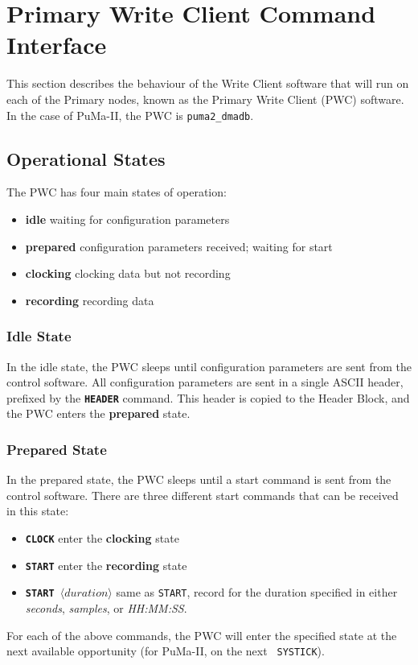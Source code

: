 \section{Primary Write Client Command Interface}
\label{sec:pwc}

This section describes the behaviour of the Write Client software that
will run on each of the Primary nodes, known as the Primary Write
Client (PWC) software.  In the case of PuMa-II, the PWC is 
{\tt puma2\_dmadb}.

\subsection{Operational States}

The PWC has four main states of operation:
\begin{itemize}
\item {\bf idle} waiting for configuration parameters
\item {\bf prepared} configuration parameters received; waiting for start
\item {\bf clocking} clocking data but not recording
\item {\bf recording} recording data
\end{itemize}

\subsubsection{Idle State}

In the idle state, the PWC sleeps until configuration parameters are
sent from the control software.  All configuration parameters are sent
in a single ASCII header, prefixed by the {\tt\bf HEADER} command.
This header is copied to the Header Block,
and the PWC enters the {\bf prepared} state.

\subsubsection{Prepared State}

In the prepared state, the PWC sleeps until a start command is sent
from the control software.  There are three different start commands
that can be received in this state:

\begin{itemize}
\item {\tt\bf CLOCK} enter the {\bf clocking} state
\item {\tt\bf START} enter the {\bf recording} state
\item {\tt\bf START $\langle duration\rangle$} same as {\tt START}, record
	for the duration specified in either {\it seconds}, {\it samples},
	or {\it HH:MM:SS}.
\end{itemize}
For each of the above commands, the PWC will enter the specified state
at the next available opportunity (for PuMa-II, on the next {\tt
SYSTICK}).

